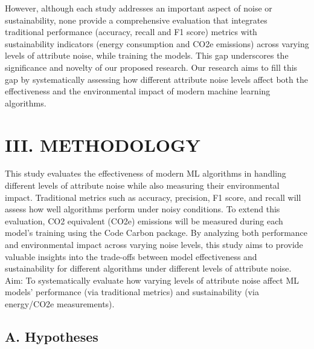 \documentclass[conference]{IEEEtran}
\begin{document}
\newline
\newline
However, although each study addresses an important aspect of noise or sustainability, none provide a comprehensive evaluation that integrates traditional performance (accuracy, recall and F1 score) metrics with sustainability indicators (energy consumption and CO2e emissions) across varying levels of attribute noise, while training the models. This gap underscores the significance and novelty of our proposed research. Our research aims to fill this gap by systematically assessing how different attribute noise levels affect both the effectiveness and the environmental impact of modern machine learning algorithms.


\section*{III. METHODOLOGY}
This study evaluates the effectiveness of modern ML algorithms in handling different levels of attribute noise while also measuring their environmental impact. Traditional metrics such as accuracy, precision, F1 score, and recall will assess how well algorithms perform under noisy conditions. To extend this evaluation, CO2 equivalent (CO2e) emissions will be measured during each model's training using the Code Carbon package. By analyzing both performance and environmental impact across varying noise levels, this study aims to provide valuable insights into the trade-offs between model effectiveness and sustainability for different algorithms under different levels of attribute noise.
\newline
\newline
Aim: To systematically evaluate how varying levels of attribute noise affect ML models' performance (via traditional metrics) and sustainability (via energy/CO2e measurements).


\subsection*{A. Hypotheses}
\end{document}
